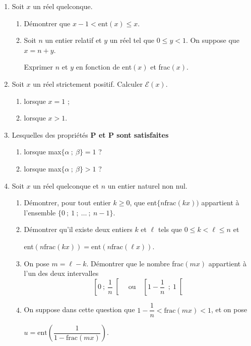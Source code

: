 \documentclass[landscape,twocolumn,leqno,a4paper,10pt]{report} %
\renewcommand{\textbf}[1]{\begingroup\bfseries\mathversion{bold}#1\endgroup}		%
\begin{document}
\begin{enumerate}
\item Soit $x$ un réel quelconque.
	\begin{enumerate}
		\item Démontrer que $x - 1 < \text{ent}(x) \leqslant x$.
		\item Soit $n$ un entier relatif et $y$ un réel tel que $0 \leqslant y < 1$. On suppose que $x = n + y$.
		
Exprimer $n$ et $y$ en fonction de ent$(x)$ et frac$(x)$.
	\end{enumerate}
\item Soit $x$ un réel strictement positif. Calculer $\mathcal{E}(x)$.
	\begin{enumerate}
		\item lorsque $x = 1$ ;
		\item lorsque $x > 1$.
	\end{enumerate}
\item Lesquelles des propriétés \textbf{P}{\small $\cap$} et \textbf{P}{\small $\cup$} sont satisfaites 
	\begin{enumerate}
		\item lorsque max$\{\alpha~;~\beta\}= 1$ ?
		\item lorsque max$\{\alpha~;~\beta\} > 1$ ?
	\end{enumerate}
\item Soit $x$ un réel quelconque et $n$ un entier naturel non nul.
	\begin{enumerate}
		\item Démontrer, pour tout entier $k \geqslant 0$, que ent$\{n\text{frac}(kx))$ appartient à l'ensemble $\{0~;~ 1~;~ \ldots~;~ n -1\}$.
		\item Démontrer qu'il existe deux entiers $k$ et $\ell$ tels que $0 \leqslant k < \ell \leqslant  n$ et
\begin{center}ent$(n \text{frac}(kx)) = \text{ent}(n\text{frac}(\ell x))$.\end{center}
		\item On pose $m = \ell - k$. Démontrer que le nombre frac$(mx)$ appartient à l'un des deux intervalles
\[\left[0~;~\dfrac 1n\right[ \quad \text{ou}\quad \left[1 - \dfrac 1n~~;~1\right[\]
		\item On suppose dans cette question que $1 -\dfrac 1n < \text{frac}(mx) < 1$, et on pose 

$u = \text{ent}\left(\dfrac{1}{1 - \text{frac}(mx)}\right)$.


\end{enumerate}
\end{enumerate}
\end{document}
